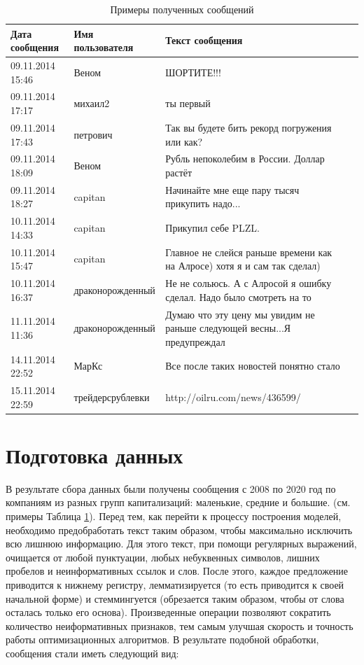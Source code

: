 \documentclass{article}
\begin{document}
\begin{table}[h]
	\caption{Примеры полученных сообщений}
	\centering
	\begin{tabular}{llp{9.45cm}l}
		\toprule
		Дата сообщения     &  Имя пользователя    & Текст сообщения  \\
		\midrule
		09.11.2014 15:46     & Веном  & ШОРТИТЕ!!!		\\
		09.11.2014 17:17     & михаил2 & ты первый	      \\
		09.11.2014 17:43     & петрович       & Так вы будете бить рекорд погружения или как?  \\
		09.11.2014 18:09     & Веном  & Рубль непоколебим в России.  Доллар растёт		\\
		09.11.2014 18:27     & capitan & Начинайте	мне еще пару тысяч прикупить надо...	      \\
		10.11.2014 14:33     & capitan       & Прикупил себе PLZL.  \\
		10.11.2014 15:47     & capitan       & Главное не слейся раньше времени	как на Алросе) хотя я и сам так сделал)  \\
		10.11.2014 16:37   & драконорожденный       & Не	не сольюсь.    А с Алросой я ошибку сделал. Надо было смотреть на то \\    
		11.11.2014 11:36     & драконорожденный       & Думаю	что эту цену мы увидим не раньше следующей весны...Я предупреждал \\    
		
		14.11.2014 22:52   & МарКс       & Все после таких новостей понятно стало \\    
		15.11.2014 22:59     & трейдерсрублевки       & http://oilru.com/news/436599/	 \\    
		\bottomrule
	\end{tabular}
	\label{tab:table}
\end{table}

\section{Подготовка данных}
В результате сбора данных были получены сообщения с 2008 по 2020 год по компаниям из разных групп капитализаций: маленькие, средние и большие. (см. примеры Таблица \ref{tab:table}). Перед тем, как перейти к процессу построения моделей, необходимо предобработать текст таким образом, чтобы максимально исключить всю лишнюю информацию. Для этого текст, при помощи регулярных выражений, очищается от любой пунктуации, любых небуквенных символов, лишних пробелов и неинформативных ссылок и слов. После этого, каждое предложение приводится к нижнему регистру, лемматизируется (то есть приводится к своей начальной форме) и стеммингуется (обрезается таким образом, чтобы от слова осталась только его основа). Произведенные операции позволяют сократить количество неиформативных признаков, тем самым улучшая скорость и точность работы оптимизационных алгоритмов. В результате подобной обработки, сообщения стали иметь следующий вид:
\end{document}
